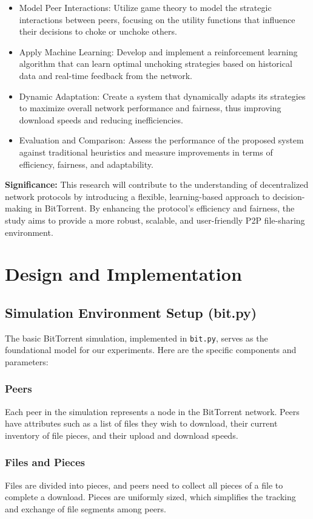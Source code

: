 \documentclass{article}
\begin{document}
\begin {itemize}
\item
Model Peer Interactions: Utilize game theory to model the strategic interactions between peers, focusing on the utility functions that influence their decisions to choke or unchoke others.
\item
Apply Machine Learning: Develop and implement a reinforcement learning algorithm that can learn optimal unchoking strategies based on historical data and real-time feedback from the network.
\item
Dynamic Adaptation: Create a system that dynamically adapts its strategies to maximize overall network performance and fairness, thus improving download speeds and reducing inefficiencies.
\item
Evaluation and Comparison: Assess the performance of the proposed system against traditional heuristics and measure improvements in terms of efficiency, fairness, and adaptability.
\end {itemize}
\textbf{Significance:}
This research will contribute to the understanding of decentralized network protocols by introducing a flexible, learning-based approach to decision-making in BitTorrent. By enhancing the protocol’s efficiency and fairness, the study aims to provide a more robust, scalable, and user-friendly P2P file-sharing environment.

\section{Design and Implementation}

\subsection{Simulation Environment Setup (bit.py)}
The basic BitTorrent simulation, implemented in \texttt{bit.py}, serves as the foundational model for our experiments. Here are the specific components and parameters:

\subsubsection{Peers}
Each peer in the simulation represents a node in the BitTorrent network. Peers have attributes such as a list of files they wish to download, their current inventory of file pieces, and their upload and download speeds.

\subsubsection{Files and Pieces}
Files are divided into pieces, and peers need to collect all pieces of a file to complete a download. Pieces are uniformly sized, which simplifies the tracking and exchange of file segments among peers.
\end{document}
